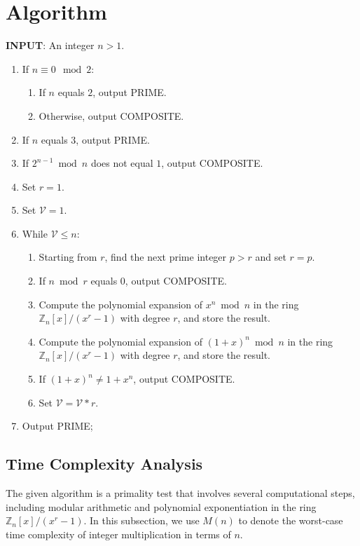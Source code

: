 \documentclass{article}
\theoremstyle{plain}
\theoremstyle{definition}
\newcommand{\Z}{\mathbb{Z}}
\newcommand{\Mx}{\Z_n[x]/(x^\D - 1)}
\newcommand{\D}{r}
\newcommand{\Vcal}{\mathcal{V}}
\begin{document}
\section{Algorithm} \label{section:algorithm}
\textbf{INPUT}: An integer $n > 1$.
\begin{center}
    \begin{enumerate}[label*=\arabic*.]
        \item If $n \equiv 0 \mod{2}$:
            \begin{enumerate}[label*=\arabic*.]
                \item If $n$ equals $2$, output PRIME.
                \item Otherwise, output COMPOSITE.
            \end{enumerate}
        \item If $n$ equals $3$, output PRIME.
        \item If $2^{n-1} \bmod{n}$ does not equal $1$, output COMPOSITE.
        \item Set $\D=1$.
        \item Set $\Vcal=1$.
        \item While $\Vcal \leq n$:
        \begin{enumerate}[label*=\arabic*.]
            \item Starting from $\D$, find the next prime integer $p > \D$ and set $\D=p$.
            \item If $n \bmod{\D}$ equals $0$, output COMPOSITE.
            \item Compute the polynomial expansion of $x^n \bmod{n}$ in the ring $\Z_n[x]/(x^\D-1)$ with degree $\D$, and store the result.
            \item Compute the polynomial expansion of $(1 + x)^n \bmod{n}$ in the ring $\Z_n[x]/(x^\D-1)$ with degree $\D$, and store the result.
            \item If $(1 + x)^n \not= 1 + x^n$, output COMPOSITE.
            \item Set $\Vcal = \Vcal \ast \D$.
        \end{enumerate}
        \item Output PRIME;
    \end{enumerate}
\end{center}

\subsection{Time Complexity Analysis} \label{subsection:timecomplexity}
The given algorithm is a primality test that involves several computational steps, including modular arithmetic and polynomial exponentiation in the ring $\Mx$. In this subsection, we use $M(n)$ to denote the worst-case time complexity of integer multiplication in terms of $n$.
\end{document}
